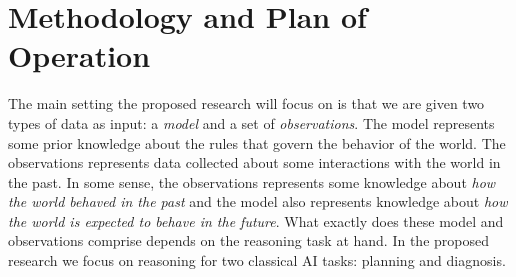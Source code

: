 \documentclass[12pt]{article}
\begin{document}






\section{Methodology and Plan of Operation}
\label{sec:methodology}


The main setting the proposed research will focus on is that we are given two types of data as input: 
a {\em model} and a set of {\em observations}. The model represents some prior knowledge about the rules that govern the behavior of the world. The observations represents data collected about some  interactions with the world in the past. In some sense, the observations represents some knowledge about {\em how the world behaved in the past} and the model also represents knowledge about {\em how the world is expected to behave in the future}. What exactly does these model and observations comprise depends on the reasoning task at hand. In the proposed research we focus on reasoning for two classical AI tasks: planning and diagnosis. 
\end{document}
